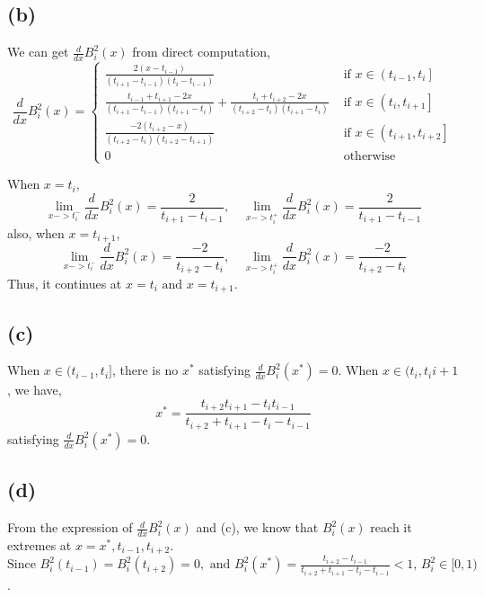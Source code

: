 \documentclass[UTF8]{ctexart}
\begin{document}
\subsection*{(b)}
We can get $\frac{d}{dx} B^2_i(x)$ from direct computation,
\begin{equation}
    \frac{d}{d x} B_{i}^{2}(x) = \left\{\begin{array}{lr}
    \frac{2\left(x-t_{i-1}\right)}{\left(t_{i+1}-t_{i-1}\right)\left(t_{i}-t_{i-1}\right)} & \text { if } x \in\left(t_{i-1}, t_{i}\right] \\
    \frac{t_{i-1}+t_{i+1}-2 x}{\left(t_{i+1}-t_{i-1}\right)\left(t_{i+1}-t_{i}\right)}+\frac{t_{i}+t_{i+2}-2 x}{\left(t_{i+2}-t_{i}\right)\left(t_{i+1}-t_{i}\right)} & \text { if } x \in\left(t_{i}, t_{i+1}\right] \\
    \frac{-2\left(t_{i+2}-x\right)}{\left(t_{i+2}-t_{i}\right)\left(t_{i+2}-t_{i+1}\right)} & \text { if } x \in\left(t_{i+1}, t_{i+2}\right] \\
    0 & \text { otherwise }
    \nonumber
    \end{array}\right.
\end{equation}

\noindent When $x = t_i$,
$$\lim_{x -> t_i^-} \frac{d}{dx}B_i^2(x) = \frac{2}{t_{i+1}-t_{i-1}},\quad \lim_{x -> t_i^+} \frac{d}{dx}B_i^2(x) = \frac{2}{t_{i+1}-t_{i-1}}$$
also, when $x = t_{i+1}$,
$$\lim_{x -> t_i^-} \frac{d}{dx}B_i^2(x) = \frac{-2}{t_{i+2}-t_{i}},\quad \lim_{x -> t_i^+} \frac{d}{dx}B_i^2(x) = \frac{-2}{t_{i+2}-t_{i}}$$
Thus, it continues at $x = t_i \text{ and } x = t_{i+1}$.
\subsection*{(c)}
\noindent When $x \in (t_{i-1}, t_i]$,  there is no $x^*$ satisfying $\frac{d}{dx}B_i^2(x^*) = 0$.
When $x \in (t_{i}, t_i{i+1}$, we have,
$$x^{*}=\frac{t_{i+2} t_{i+1}-t_{i} t_{i-1}}{t_{i+2}+t_{i+1}-t_{i}-t_{i-1}}$$
\noindent satisfying $\frac{d}{dx}B_i^2(x^*) = 0$.

\subsection*{(d)}
\noindent From the expression of $\frac{d}{dx}B_i^2(x)$ and (c), we know that $B_i^2(x)$ reach it extremes at $x = x^*, t_{i-1},t_{i+2}$.\\
$\text {Since } B_{i}^{2}\left(t_{i-1}\right)=B_{i}^{2}\left(t_{i+2}\right)=0, \text { and } B_{i}^{2}\left(x^{*}\right)=\frac{t_{i+2}-t_{i-1}}{t_{i+2}+t_{i+1}-t_{i}-t_{i-1}}<1 \text{, } B_{i}^{2} \in [0,1)$.
\end{document}
